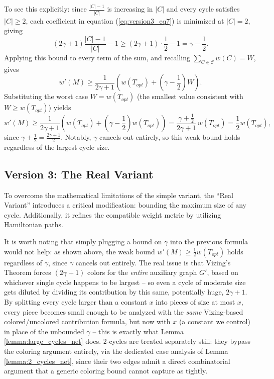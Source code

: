 To see this explicitly: since $\frac{|C|-1}{|C|}$ is increasing in $|C|$ and
every cycle satisfies $|C| \ge 2$, each coefficient in equation
(\ref{eq:version3_eq7}) is minimized at $|C| = 2$, giving
\begin{equation}
(2\gamma + 1)\frac{|C| - 1}{|C|} - 1 \ge (2\gamma + 1)\cdot\frac{1}{2} - 1 = \gamma - \frac{1}{2}.
\end{equation}
Applying this bound to every term of the sum, and recalling $\sum_{C \in
\mathcal{C}} w(C) = W$, gives
\begin{equation}
w'(M) \ge \frac{1}{2\gamma + 1}\left(w(T_{opt}) + \left(\gamma - \frac{1}{2}\right)W\right).
\end{equation}
Substituting the worst case $W = w(T_{opt})$ (the smallest value consistent with
$W \ge w(T_{opt})$) yields
\begin{equation}
w'(M) \ge \frac{1}{2\gamma + 1}\left(w(T_{opt}) + \left(\gamma - \frac{1}{2}\right)w(T_{opt})\right) = \frac{\gamma + \frac{1}{2}}{2\gamma + 1}\, w(T_{opt}) = \frac{1}{2}w(T_{opt}),
\end{equation}
since $\gamma + \frac{1}{2} = \frac{2\gamma+1}{2}$. Notably, $\gamma$ cancels
out entirely, so this weak bound holds regardless of the largest cycle size.
\subsection{Version 3: The Real Variant}

To overcome the mathematical limitations of the simple variant, the ``Real
Variant'' introduces a critical modification: bounding the maximum size of any
cycle. Additionally, it refines the compatible weight metric by utilizing
Hamiltonian paths.

It is worth noting that simply plugging a bound on $\gamma$ into the previous
formula would not help: as shown above, the weak bound $w'(M) \ge
\frac{1}{2}w(T_{opt})$ holds regardless of $\gamma$, since $\gamma$ cancels out
entirely. The real issue is that Vizing's Theorem forces $(2\gamma+1)$ colors
for the \emph{entire} auxiliary graph $G'$, based on whichever single cycle
happens to be largest -- so even a cycle of moderate size gets diluted by
dividing its contribution by this same, potentially huge, $2\gamma+1$. By
splitting every cycle larger than a constant $x$ into pieces of size at most
$x$, every piece becomes small enough to be analyzed with the \emph{same}
Vizing-based colored/uncolored contribution formula, but now with $x$ (a
constant we control) in place of the unbounded $\gamma$ -- this is exactly what
Lemma \ref{lemma:large_cycles_net} does. 2-cycles are treated separately still:
they bypass the coloring argument entirely, via the dedicated case analysis of
Lemma \ref{lemma:2_cycles_net}, since their two edges admit a direct
combinatorial argument that a generic coloring bound cannot capture as tightly.

